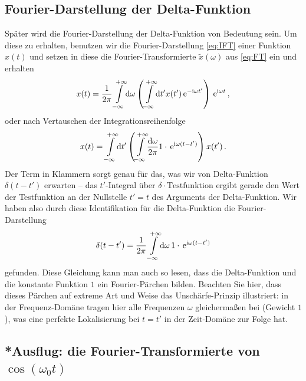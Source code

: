 \documentclass[paper=a4, fontsize=11.0pt, abstractoff, DIV12]{scrartcl}
\begin{document}
\subsection{Fourier-Darstellung der Delta-Funktion}

Später wird die Fourier-Darstellung der Delta-Funktion von Bedeutung sein.
Um diese zu erhalten, benutzen wir die Fourier-Darstellung \eqref{eq:IFT}
einer Funktion $x(t)$ und setzen in diese die Fourier-Transformierte $\tilde
x(\omega)$ aus \eqref{eq:FT} ein und erhalten
\begin{equation}
x(t) = \frac{1}{2\pi}\int\limits_{-\infty}^{+\infty}\!\mathrm{d}\omega \left( \int\limits_{-\infty}^{+\infty}\!\mathrm{d} t' x(t') \,{\mathrm{e}}^{-\mathrm{i}\omega t'} \right) \,{\mathrm{e}}^{\mathrm{i} \omega t}\,,
\end{equation}
oder nach Vertauschen der Integrationsreihenfolge
\begin{equation}
x(t) = \int\limits_{-\infty}^{+\infty}\!\mathrm{d} t' \left( \int\limits_{-\infty}^{+\infty}\!\frac{\mathrm{d}\omega}{2\pi} 1\cdot\,{\mathrm{e}}^{\mathrm{i} \omega (t-t')} \right)x(t')\,.
\end{equation}
Der Term in Klammern sorgt genau für das, was wir von Delta-Funktion
$\delta(t-t')$ erwarten -- das $t'$-Integral über $\delta \cdot
\mathrm{Testfunktion}$ ergibt gerade den Wert der Testfunktion an der
Nullstelle $t'=t$ des Arguments der Delta-Funktion. Wir haben also durch
diese Identifikation für die Delta-Funktion die Fourier-Darstellung
\begin{equation}
\delta(t-t') = \frac{1}{2\pi} \int\limits_{-\infty}^{+\infty}\!{\mathrm{d}\omega}\, 1\cdot\,{\mathrm{e}}^{\mathrm{i} \omega (t-t')}
\label{eq:DeltaFT}
\end{equation}
gefunden. Diese Gleichung kann man auch so lesen, dass die Delta-Funktion
und die konstante Funktion $1$ ein Fourier-Pärchen bilden. Beachten Sie
hier, dass dieses Pärchen auf extreme Art und Weise das Unschärfe-Prinzip
illustriert: in der Frequenz-Domäne tragen hier alle Frequenzen $\omega$
gleichermaßen bei (Gewicht $1$), was eine perfekte Lokalisierung  bei $t=t'$
in der Zeit-Domäne zur Folge hat.

\subsection{*Ausflug: die Fourier-Transformierte von $\cos(\omega_0 t)$}
\end{document}
